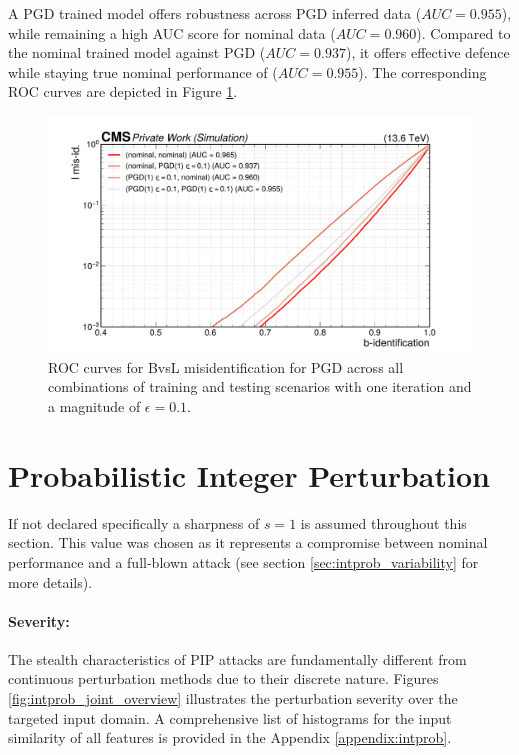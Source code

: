 A PGD trained model offers robustness across PGD inferred data ($AUC=0.955$), while remaining a high AUC score for nominal data ($AUC=0.960$). Compared to the nominal trained model against PGD ($AUC=0.937$), it offers effective defence while staying true nominal performance of ($AUC=0.955$). The corresponding ROC curves are depicted in Figure \ref{fig:pgd_trained}. 

\begin{figure}[h]
\centering
    \includegraphics[width=15cm]{media/output/roc_bvsl_pgd_perms.pdf}
    \caption{ROC curves for BvsL misidentification for PGD across all combinations of training and testing scenarios with one iteration and a magnitude of $\epsilon=0.1$.}
    \label{fig:pgd_trained}
\end{figure}

\FloatBarrier
\section{Probabilistic Integer Perturbation}
\label{sec:inprob_result}

If not declared specifically a sharpness of $s=1$ is assumed throughout this section. This value was chosen as it represents a compromise between nominal performance and a full-blown attack (see section \ref{sec:intprob_variability} for more details).

\paragraph{Severity:} The stealth characteristics of PIP attacks are fundamentally different from continuous perturbation methods due to their discrete nature. Figures \ref{fig:intprob_joint_overview} illustrates the perturbation severity over the targeted input domain. A comprehensive list of histograms for the input similarity of all features is provided in the Appendix \ref{appendix:intprob}.

